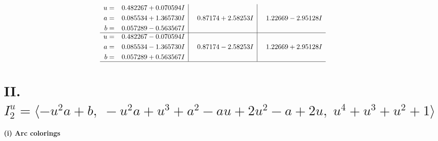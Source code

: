 \documentclass[1p]{elsarticle_modified}
\theoremstyle{definition}
\begin{document}
$$\begin{array}{c|c|c}
\begin{aligned}
u &= \phantom{-}0.482267 + 0.070594 I \\
a &= \phantom{-}0.085534 + 1.365730 I \\
b &= \phantom{-}0.057289 - 0.563567 I\end{aligned}
 & \phantom{-}0.87174 + 2.58253 I & \phantom{-}1.22669 - 2.95128 I \\ \hline\begin{aligned}
u &= \phantom{-}0.482267 - 0.070594 I \\
a &= \phantom{-}0.085534 - 1.365730 I \\
b &= \phantom{-}0.057289 + 0.563567 I\end{aligned}
 & \phantom{-}0.87174 - 2.58253 I & \phantom{-}1.22669 + 2.95128 I\\
 \hline 
 \end{array}$$\newpage\newpage\renewcommand{\arraystretch}{1}
\centering \section*{II. $I^u_{2}= \langle - u^2 a+b,\;- u^2 a+u^3+a^2- a u+2 u^2- a+2 u,\;u^4+u^3+u^2+1 \rangle$}
\flushleft \textbf{(i) Arc colorings}\\
\end{document}
